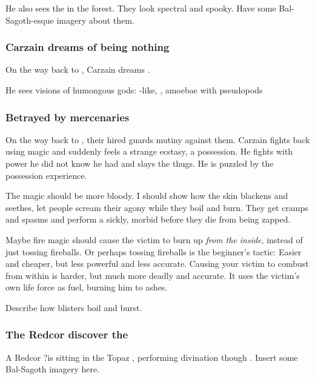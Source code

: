He also sees the  in the forest. They look spectral and spooky. Have some Bal-Sagoth-esque imagery about them.






\subsubsection{Carzain dreams of being nothing}
On the way back to , Carzain dreams . 

He sees visions of humongous gods: 
\Human-like, \dragons, amoebae with pseudopods\prikker





\subsubsection{Betrayed by mercenaries}
On the way back to , their hired guards mutiny against them. Carzain fights back using magic and suddenly feels a strange ecstasy, a possession. He fights with power he did not know he had and slays the thugs. He is puzzled by the possession experience. 

The magic should be more bloody. I should show how the skin blackens and seethes, let people scream their agony while they boil and burn. They get cramps and spasms and perform a sickly, morbid  before they die from being zapped. 

Maybe fire magic should cause the victim to burn up \emph{from the inside}, instead of just tossing fireballs. Or perhaps tossing fireballs is the beginner's tactic: Easier and cheaper, but less powerful and less accurate. Causing your victim to combust from within is harder, but much more deadly and accurate. It uses the victim's own life force as fuel, burning him to ashes. 

Describe how blisters boil and burst. 





\subsubsection{The Redcor discover the \vertexspike}
A Redcor \matron\dash\Esmerel?\dash is sitting in the Topaz \Chateau, performing divination though . Insert some Bal-Sagoth imagery here. 

